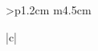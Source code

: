 \begin{tabular}{>{\bfseries}p{1.2cm} m{4.5cm}}
\begin{tabular}[t]{|c|}
\begin{longtable}
\begin{comment}
\topline
\begin{center}
\begin{tabular}{c@{\qquad\qquad\qquad}c}
\small
  \begin{tabular}[t]{r@{\;}c@{\;}l}
      1 & = & I\\
      2 & = & II\\
      3 & = & III\\
      4 & = & IV\\
      5 & = & V\\
      6 & = & VI\\
      7 & = & VII\\
      8 & = & VIII\\
      9 & = & IX\\
     10 & = & X\\
     20 & = & XX\\
     30 & = & XXX\\
     40 & = & XL\\
     50 & = & L\\
     60 & = & LX\\
     70 & = & LXX\\
     80 & = & LXXX\\
     90 & = & XC\\
    100 & = & C
  \end{tabular}&
  \begin{tabular}[t]{r@{\;}c@{\;}l}
          500 & = & D or L\nbrotC\\
        1,000 & = & M or C\nbrotC\\
        2,000 & = & MM or II\nbrotC\nbrotC\nbrotC\\
        5,000 & = & $\overline{\text{V}}$ or L\nbrotC\nbrotC\\
        6,000 & = & $\overline{\text{VI}}$ or LX\nbrotC\nbrotC\\ %
       10,000 & = & $\overline{\text{X}}$ or C\nbrotC\nbrotC\\
       50,000 & = & $\overline{\text{L}}$ or L\nbrotC\nbrotC\nbrotC\\
       60,000 & = & $\overline{\text{LX}}$ or LX\nbrotC\nbrotC\nbrotC\\ %
      100,000 & = & $\overline{\text{C}}$ or C\nbrotC\nbrotC\nbrotC\\
    1,000,000 & = & $\overline{\text{M}}$ or C\nbrotC\nbrotC\nbrotC\nbrotC\\
    2,000,000 & = & $\overline{\text{MM}}$ or MM\nbrotC\nbrotC\nbrotC\\[1ex]
    \multicolumn{3}{c}{\parbox{14em}{When a line is drawn over a number it means that its value is increased 1000 times.}}
  \end{tabular}
\end{tabular}
\end{center}
\captionof{table}{Roman numerals}
\label{tbl:romannumerals}
\bottomline
\medskip


\end{comment}
\end{longtable}
\end{tabular}
\end{tabular}
